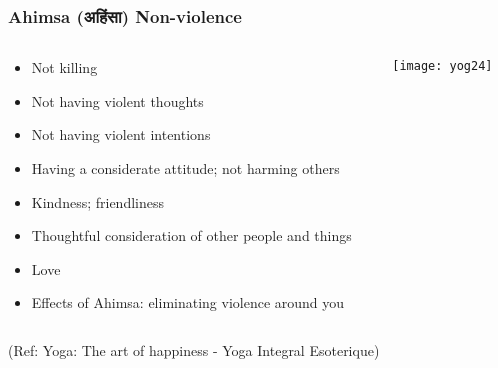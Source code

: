 \begin{frame}[fragile]\frametitle{Ahimsa (अहिंसा) Non-violence}

   \begin{columns}
    \begin{column}[t]{0.7\linewidth}
	
	\begin{itemize}
	\item Not killing
	\item Not having violent thoughts
	\item Not having violent intentions
	\item Having a considerate attitude; not harming others
	\item Kindness; friendliness
	\item Thoughtful consideration of other people and things
	\item Love
	\item Effects of Ahimsa: eliminating violence around you
	\end{itemize}
	
    \end{column}
    \begin{column}[t]{0.3\linewidth}	
\begin{center}
\texttt{[image: yog24]}

\end{center}


    \end{column}
  \end{columns}
  
  \tiny{(Ref: Yoga: The art of happiness - Yoga Integral Esoterique)}

\end{frame}

